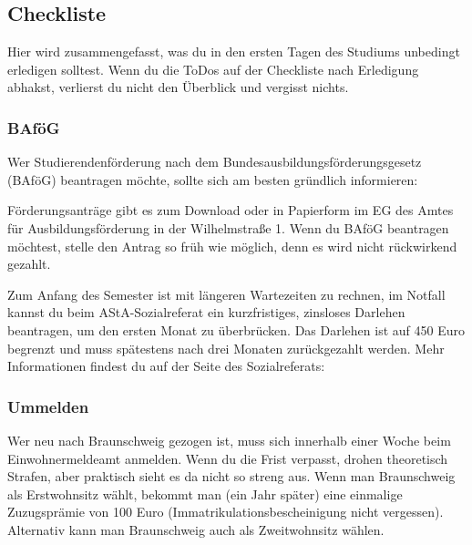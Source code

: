
\subsection{Checkliste}
\label{checkliste}
	Hier wird zusammengefasst, was du in den ersten Tagen des Studiums unbedingt erledigen solltest. Wenn du die ToDos auf der Checkliste nach Erledigung abhakst, verlierst du nicht den Überblick und vergisst nichts.
	
\vspace*{0.5cm}


\begin{multicols}{2}

\subsubsection{BAföG}
	\label{todobafoeg}

	Wer Studierendenförderung nach dem Bundesausbildungsförderungsgesetz (BAföG) beantragen möchte, sollte sich am besten gründlich informieren: 
 
	Förderungsanträge gibt es zum Download oder in Papierform im EG des Amtes für Ausbildungsförderung in der Wilhelmstraße 1. Wenn du BAföG beantragen möchtest, stelle den Antrag so früh wie möglich, denn es wird nicht rückwirkend gezahlt.

	Zum Anfang des Semester ist mit längeren Wartezeiten zu rechnen, im Notfall kannst du beim AStA-Sozialreferat ein kurzfristiges, zinsloses Darlehen beantragen, um den ersten Monat zu überbrücken. Das Darlehen ist auf 450 Euro begrenzt und muss spätestens nach drei Monaten zurückgezahlt werden. Mehr Informationen findest du auf der Seite des Sozialreferats: 


\subsubsection{Ummelden}
	\label{todoummelden}

	Wer neu nach Braunschweig gezogen ist, muss sich innerhalb einer Woche beim Einwohnermeldeamt anmelden. Wenn du die Frist verpasst, drohen theoretisch Strafen, aber praktisch sieht es da nicht so streng aus. Wenn man Braunschweig als Erstwohnsitz wählt, bekommt man (ein Jahr später) eine einmalige Zuzugsprämie von 100 Euro (Immatrikulationsbescheinigung nicht vergessen). Alternativ kann man Braunschweig auch als Zweitwohnsitz wählen.


\end{multicols}
